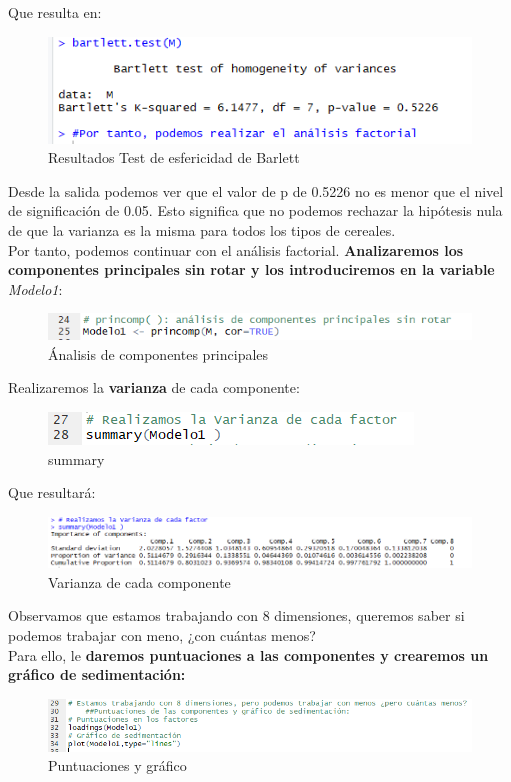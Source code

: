 \documentclass[12pt,a4paper]{book}
\begin{document}
Que resulta en: 
\begin{figure}[H]
\centering
\includegraphics[scale=1]{Captura8.png} 
\caption{Resultados Test de esfericidad de Barlett}
\label{fig:barR}
\end{figure}
Desde la salida podemos ver que el valor de p de 0.5226 no es menor que el nivel de significación de 0.05. Esto significa que no podemos rechazar la hipótesis nula de que la varianza es la misma para todos los tipos de cereales.
\\Por tanto, podemos continuar con el análisis factorial. 
\textbf{Analizaremos los componentes principales sin rotar y los introduciremos en la variable} \textit{Modelo1}: 
\begin{figure}[H]
\centering
\includegraphics[scale=1]{Captura9.png} 
\caption{Ánalisis de componentes principales}
\label{fig:a1}
\end{figure}
Realizaremos la\textbf{ varianza }de cada componente: 
\begin{figure}[H]
\centering
\includegraphics[scale=1]{Captura10.png} 
\caption{summary}
\label{fig:a1}
\end{figure}
Que resultará: 
\begin{figure}[H]
\centering
\includegraphics[scale=0.7]{Captura11.png} 
\caption{Varianza de cada componente}
\label{fig:v1}
\end{figure}
Observamos que estamos trabajando con 8 dimensiones, queremos saber si podemos trabajar con meno,  ¿con cuántas menos? 
\\Para ello, le \textbf{daremos puntuaciones a las componentes y crearemos un gráfico de sedimentación: }
\begin{figure}[H]
\centering
\includegraphics[scale=0.75]{Captura12.png} 
\caption{Puntuaciones y gráfico}
\label{fig:p1}
\end{figure}
\end{document}
